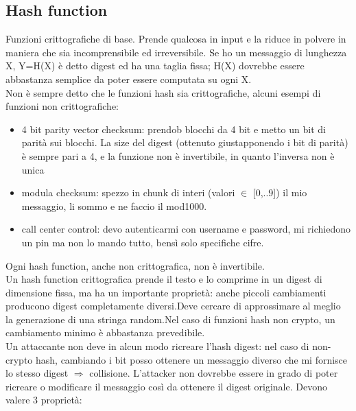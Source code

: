 \documentclass[16px]{article}
\begin{document}
\subsection{Hash function}
Funzioni crittografiche di base. Prende qualcosa in input e la riduce in polvere in maniera che sia incomprensibile ed irreversibile. Se ho un messaggio di lunghezza X, Y=H(X) è detto digest ed ha una taglia fissa; H(X) dovrebbe essere abbastanza semplice da poter essere computata su ogni X.\\ Non è sempre detto che le funzioni hash sia crittografiche, alcuni esempi di funzioni non crittografiche:
\begin{itemize}
\item 4 bit parity vector checksum: prendob blocchi da 4 bit e metto un bit di parità sui blocchi. La size del digest (ottenuto giustapponendo i bit di parità) è sempre pari a 4, e la funzione non è invertibile, in quanto l'inversa non è unica
\item modula checksum: spezzo in chunk di interi (valori $\in$ [0,..9]) il mio messaggio, li sommo e ne faccio il mod1000.
\item call center control: devo autenticarmi con username e password, mi richiedono un pin ma non lo mando tutto, bensì solo specifiche cifre.
\end{itemize}
Ogni hash function, anche non crittografica, non è invertibile.\\ Un hash function crittografica prende il testo e lo comprime in un digest di dimensione fissa, ma ha un importante proprietà: anche piccoli cambiamenti producono digest completamente diversi.Deve cercare di approssimare al meglio la generazione di una stringa random.Nel caso di funzioni hash non crypto, un cambiamento minimo è abbastanza prevedibile.\\ Un attaccante non deve in alcun modo ricreare l'hash digest: nel caso di non-crypto hash, cambiando i bit posso ottenere un messaggio diverso che mi fornisce lo stesso digest $\Rightarrow$ collisione. L'attacker non dovrebbe essere in grado di poter ricreare o modificare il messaggio così da ottenere il digest originale. Devono valere 3 proprietà:
\end{document}
